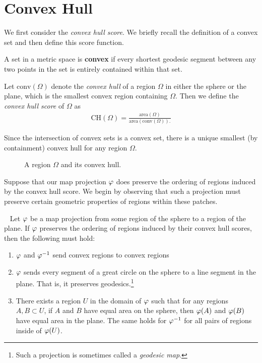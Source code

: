 \section{Convex Hull}\label{sec:ch}
We first consider the \textit{convex hull
score}.  We briefly recall the definition of a convex set and then
define this score function.



\begin{definition}
	A set in a metric space is \textbf{convex} if every shortest geodesic segment between any two points in the set is entirely 
	contained within that set.
\end{definition}





\begin{definition}
  Let $\mathrm{conv}(\Omega)$ denote the \textit{convex hull} of
  a region $\Omega$ in either the sphere or the plane, which is the
  smallest convex region containing $\Omega$.  Then we define the
  \textit{convex hull score} of $\Omega$ as 
  \begin{align*}
    \mathrm{CH}(\Omega)=
    \frac{\mathrm{area}(\Omega)}{\mathrm{area}(\mathrm{conv}(\Omega)).}
  \end{align*}
  
  Since the intersection of convex sets is a convex set, there is a unique smallest (by containment) convex hull for any region $\Omega$.
\end{definition}



\begin{figure}[htb]
	\centering
	
	\caption{A region $\Omega$ and its convex hull.}
	\label{fig:ch_example}
\end{figure}

Suppose that our map projection $\varphi$ does  preserve the ordering of regions induced by the convex hull score.  We begin by observing that such a projection must preserve certain geometric properties of regions within these patches.
\begin{lemma}~\label{lem:CH_prep}
	Let $\varphi$ be a map projection from some region of the sphere to a region of the plane. If $\varphi$ preserves the ordering of regions induced by their convex hull scores, then the following must 
	hold:
	\begin{enumerate}
		\item $\varphi$ and $\varphi^{-1}$ send convex regions to convex regions
		\item $\varphi$ sends every segment of a great circle on the sphere to a line segment in the plane.  That is, it preserves geodesics.\footnote{Such a projection is sometimes called a \textit{geodesic map}.}
		\item There exists a region $U$ in the domain of $\varphi$
		such that for any regions $A,B\subset U$, if 
		$A$ and $B$ have equal area on the sphere, then 
		$\varphi(A)$ and $\varphi(B)$ have equal area in the plane.  The same holds 
		for $\varphi^{-1}$ for all pairs of regions inside of $\varphi(U)$.
	\end{enumerate}
\end{lemma}



